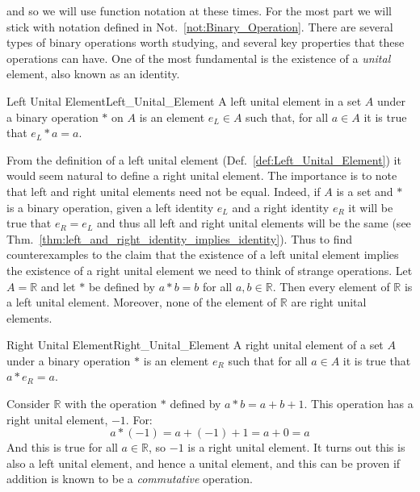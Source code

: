     and so we will use function notation at these times. For the most part we
    will stick with notation defined in Not.~\ref{not:Binary_Operation}. There
    are several types of binary operations worth studying, and several key
    properties that these operations can have. One of the most fundamental is
    the existence of a \textit{unital} element, also known as an identity.
    \begin{fdefinition}{Left Unital Element}{Left_Unital_Element}
        A left unital element in a \gls{set} $A$ under a \gls{binary operation}
        $*$ on $A$ is an element $e_{L}\in{A}$ such that, for all $a\in{A}$ it
        is true that $e_{L}*a=a$.
    \end{fdefinition}
    \begin{example}
        From the definition of a left unital element
        (Def.~\ref{def:Left_Unital_Element}) it would seem natural to define a
        right unital element. The importance is to note that left and right
        unital elements need not be equal. Indeed, if $A$ is a set and $*$ is
        a binary operation, given a left identity $e_{L}$ and a right identity
        $e_{R}$ it will be true that $e_{R}=e_{L}$ and thus all left and right
        unital elements will be the same
        (see Thm.~\ref{thm:left_and_right_identity_implies_identity}). Thus to
        find counterexamples to the claim that the existence of a left unital
        element implies the existence of a right unital element we need to think
        of strange operations. Let $A=\mathbb{R}$ and let $*$ be defined by
        $a*b=b$ for all $a,b\in\mathbb{R}$. Then every element of $\mathbb{R}$
        is a left unital element. Moreover, none of the element of $\mathbb{R}$
        are right unital elements.
    \end{example}
    \begin{fdefinition}{Right Unital Element}{Right_Unital_Element}
        A right unital element of a \gls{set} $A$ under a \gls{binary operation}
        $*$ is an element $e_{R}$ such that for all $a\in{A}$ it is true that
        $a*e_{R}=a$.
    \end{fdefinition}
    \begin{example}
        Consider $\mathbb{R}$ with the operation $*$ defined by $a*b=a+b+1$.
        This operation has a right unital element, $\minus{1}$. For:
        \begin{equation}
            a*(\minus{1})=a+(\minus{1})+1=a+0=a
        \end{equation}
        And this is true for all $a\in\mathbb{R}$, so $\minus{1}$ is a right
        unital element. It turns out this is also a left unital element, and
        hence a unital element, and this can be proven if addition is known to
        be a \textit{commutative} operation.
    \end{example}
